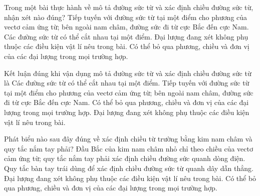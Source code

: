 \begin{ex}
Trong một bài thực hành về mô tả đường sức từ và xác định chiều đường sức từ, nhận xét nào đúng?
\choice
{\True Tiếp tuyến với đường sức từ tại một điểm cho phương của vectơ cảm ứng từ; bên ngoài nam châm, đường sức đi từ cực Bắc đến cực Nam.}
{Các đường sức từ có thể cắt nhau tại một điểm.}
{Đại lượng đang xét không phụ thuộc các điều kiện vật lí nêu trong bài.}
{Có thể bỏ qua phương, chiều và đơn vị của các đại lượng trong mọi trường hợp.}
\end{ex}

\begin{ex}
Kết luận đúng khi vận dụng mô tả đường sức từ và xác định chiều đường sức từ là
\choice
{Các đường sức từ có thể cắt nhau tại một điểm.}
{\True Tiếp tuyến với đường sức từ tại một điểm cho phương của vectơ cảm ứng từ; bên ngoài nam châm, đường sức đi từ cực Bắc đến cực Nam.}
{Có thể bỏ qua phương, chiều và đơn vị của các đại lượng trong mọi trường hợp.}
{Đại lượng đang xét không phụ thuộc các điều kiện vật lí nêu trong bài.}
\end{ex}

\begin{ex}
Phát biểu nào sau đây đúng về xác định chiều từ trường bằng kim nam châm và quy tắc nắm tay phải?
\choice
{\True Đầu Bắc của kim nam châm nhỏ chỉ theo chiều của vectơ cảm ứng từ; quy tắc nắm tay phải xác định chiều đường sức quanh dòng điện.}
{Quy tắc bàn tay trái dùng để xác định chiều đường sức từ quanh dây dẫn thẳng.}
{Đại lượng đang xét không phụ thuộc các điều kiện vật lí nêu trong bài.}
{Có thể bỏ qua phương, chiều và đơn vị của các đại lượng trong mọi trường hợp.}
\end{ex}

